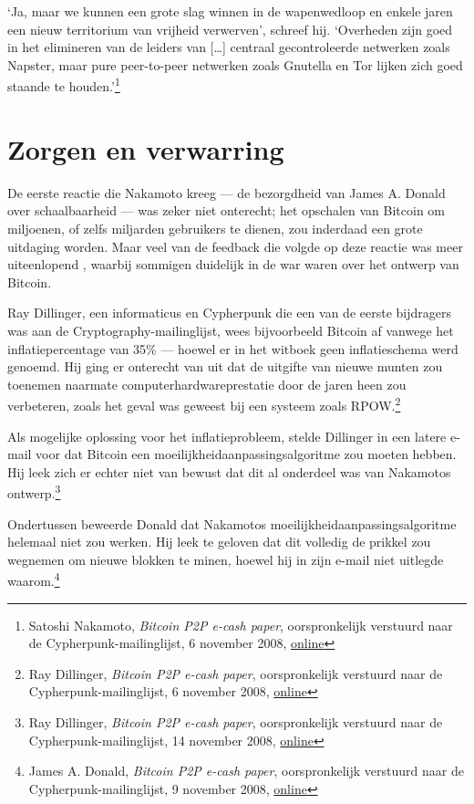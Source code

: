 \documentclass[
  a5paper,
  smalldemyvopaper,11pt,twoside,onecolumn,openright,extrafontsizes,
hidelinks]{memoir}
\begin{document}
`Ja, maar we kunnen een grote slag winnen in de wapenwedloop en enkele
jaren een nieuw territorium van vrijheid verwerven', schreef hij.
`Overheden zijn goed in het elimineren van de leiders van {[}\ldots{]}
centraal gecontroleerde netwerken zoals Napster, maar pure peer-to-peer
netwerken zoals Gnutella en Tor lijken zich goed staande te
houden.'\footnote{Satoshi Nakamoto, \emph{Bitcoin P2P e-cash paper},
  oorspronkelijk verstuurd naar de Cypherpunk-mailinglijst, 6 november
  2008,
  \href{https://www.metzdowd.com/pipermail/cryptography/2008-November/014823.html}{online}}

\section{Zorgen en verwarring}\label{zorgen-en-verwarring}

De eerste reactie die Nakamoto kreeg --- de bezorgdheid van James A.
Donald over schaalbaarheid --- was zeker niet onterecht; het opschalen
van Bitcoin om miljoenen, of zelfs miljarden gebruikers te dienen, zou
inderdaad een grote uitdaging worden. Maar veel van de feedback die
volgde op deze reactie was meer uiteenlopend , waarbij sommigen
duidelijk in de war waren over het ontwerp van Bitcoin.

Ray Dillinger, een informaticus en Cypherpunk die een van de eerste
bijdragers was aan de Cryptography-mailinglijst, wees bijvoorbeeld
Bitcoin af vanwege het inflatiepercentage van 35\% --- hoewel er in het
witboek geen inflatieschema werd genoemd. Hij ging er onterecht van uit
dat de uitgifte van nieuwe munten zou toenemen naarmate
computerhardwareprestatie door de jaren heen zou verbeteren, zoals het
geval was geweest bij een systeem zoals RPOW.\footnote{Ray Dillinger,
  \emph{Bitcoin P2P e-cash paper}, oorspronkelijk verstuurd naar de
  Cypherpunk-mailinglijst, 6 november 2008,
  \href{https://www.metzdowd.com/pipermail/cryptography/2008-November/014822.html}{online}}

Als mogelijke oplossing voor het inflatieprobleem, stelde Dillinger in
een latere e-mail voor dat Bitcoin een moeilijkheidaanpassingsalgoritme
zou moeten hebben. Hij leek zich er echter niet van bewust dat dit al
onderdeel was van Nakamotos ontwerp.\footnote{Ray Dillinger,
  \emph{Bitcoin P2P e-cash paper}, oorspronkelijk verstuurd naar de
  Cypherpunk-mailinglijst, 14 november 2008,
  \href{https://www.metzdowd.com/pipermail/cryptography/2008-November/014857.html}{online}}

Ondertussen beweerde Donald dat Nakamotos
moeilijkheidaanpassingsalgoritme helemaal niet zou werken. Hij leek te
geloven dat dit volledig de prikkel zou wegnemen om nieuwe blokken te
minen, hoewel hij in zijn e-mail niet uitlegde waarom.\footnote{James A.
  Donald, \emph{Bitcoin P2P e-cash paper}, oorspronkelijk verstuurd naar
  de Cypherpunk-mailinglijst, 9 november 2008,
  \href{https://www.metzdowd.com/pipermail/cryptography/2008-November/014837.html}{online}}
\end{document}
